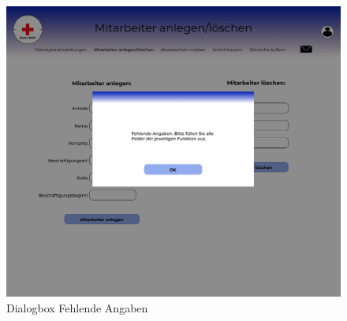 \documentclass[11pt,
paper=a4,
bibtotocnumbered,	  %
liststotocnumbered,  %
DIV=calc,		  %
tablecaptionabove,	  %
headinclude,
]{article}
\begin{document}
\begin{figure}[H]
\includegraphics[width=1\textwidth]{Bilder/Screens/loeschen-Dialogbox(1)-1.jpg}{\centering}
\caption{Dialogbox Fehlende Angaben}
\end{figure}
\end{document}
